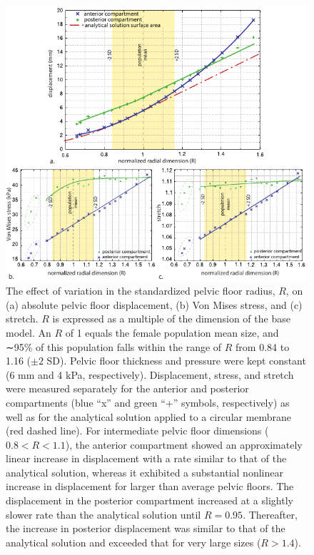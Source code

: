\documentclass[9pt,twocolumn,twoside]{pnas-new}
\begin{document}
\begin{figure}
\centering
\includegraphics[width=.8\textwidth]{figs/fig2}
\caption{The effect of variation in the standardized pelvic floor radius, $R$, on (a) absolute pelvic floor displacement, (b) Von Mises stress, and (c) stretch. $R$ is
expressed as a multiple of the dimension of the base model. An $R$ of 1 equals the female population mean size, and ∼95\% of this population falls within the
range of $R$ from 0.84 to 1.16 ($\pm2$ SD). Pelvic floor thickness and pressure were kept constant (6 mm and 4 kPa, respectively). Displacement, stress, and stretch
were measured separately for the anterior and posterior compartments (blue “x” and green “+” symbols, respectively) as well as for the analytical solution
applied to a circular membrane (red dashed line). For intermediate pelvic floor dimensions ($0.8 < R < 1.1$), the anterior compartment showed an approximately
linear increase in displacement with a rate similar to that of the analytical solution, whereas it exhibited a substantial nonlinear increase in displacement
for larger than average pelvic floors. The displacement in the posterior compartment increased at a slightly slower rate than the analytical solution
until $R = 0.95$. Thereafter, the increase in posterior displacement was similar to that of the analytical solution and exceeded that for very large sizes ($R > 1.4$).}
\label{fig:radius}
\end{figure}
\end{document}
